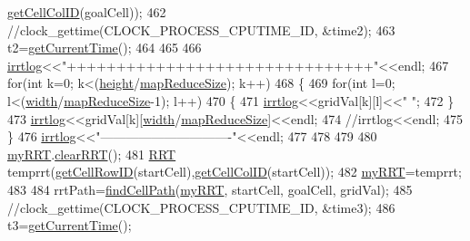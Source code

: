 \begin{DoxyCode}
{{{      \hyperlink{classrrt__plan_1_1rrt__planner_a758810b2f257fe0778ed3eb1e970d99c}{getCellColID}(goalCell));
462             \textcolor{comment}{//clock\_gettime(CLOCK\_PROCESS\_CPUTIME\_ID, &time2);}
463              t2=\hyperlink{rrt__planner_8cpp_a3b34910310800875174c4846e64a61bd}{getCurrentTime}();
464             
465             
466             \hyperlink{rrt__planner_8cpp_ae63d6003ff9416f7c0be6892e5bb899c}{irrtlog}<<\textcolor{stringliteral}{"+++++++++++++++++++++++++++++++"}<<endl;
467             \textcolor{keywordflow}{for}(\textcolor{keywordtype}{int} k=0; k<(\hyperlink{classrrt__plan_1_1rrt__planner_a3549de56a50bff6494514878b64584df}{height}/\hyperlink{rrt_8h_afb8b6147953aaf9e7089f5f157d5b020}{mapReduceSize}); k++)
468             \{
469                 \textcolor{keywordflow}{for}(\textcolor{keywordtype}{int} l=0; l<(\hyperlink{classrrt__plan_1_1rrt__planner_ac74fe436b5e1fa30bda1fbe821369aa2}{width}/\hyperlink{rrt_8h_afb8b6147953aaf9e7089f5f157d5b020}{mapReduceSize}-1); l++)
470                 \{
471                     \hyperlink{rrt__planner_8cpp_ae63d6003ff9416f7c0be6892e5bb899c}{irrtlog}<<gridVal[k][l]<<\textcolor{stringliteral}{" "};
472                 \}
473                 \hyperlink{rrt__planner_8cpp_ae63d6003ff9416f7c0be6892e5bb899c}{irrtlog}<<gridVal[k][\hyperlink{classrrt__plan_1_1rrt__planner_ac74fe436b5e1fa30bda1fbe821369aa2}{width}/\hyperlink{rrt_8h_afb8b6147953aaf9e7089f5f157d5b020}{mapReduceSize}]<<endl;
474                 \textcolor{comment}{//irrtlog<<endl;}
475             \}
476             \hyperlink{rrt__planner_8cpp_ae63d6003ff9416f7c0be6892e5bb899c}{irrtlog}<<\textcolor{stringliteral}{"-------------------------------"}<<endl;
477             
478             
479 
480             \hyperlink{rrt__planner_8cpp_a51725e16375c08b52f82eb2faa5a921c}{myRRT}.\hyperlink{classRRT_affd1f4f4e35541cdca748bac5c1bbd34}{clearRRT}();
481             \hyperlink{classRRT}{RRT} temprrt(\hyperlink{classrrt__plan_1_1rrt__planner_aa3c07d6b2b6bed62e4b60d3898fc80cf}{getCellRowID}(startCell),\hyperlink{classrrt__plan_1_1rrt__planner_a758810b2f257fe0778ed3eb1e970d99c}{getCellColID}(startCell));
482             \hyperlink{rrt__planner_8cpp_a51725e16375c08b52f82eb2faa5a921c}{myRRT}=temprrt;
483 
484             rrtPath=\hyperlink{classrrt__plan_1_1rrt__planner_a23e32ef1c189f5035a751047f84e052a}{findCellPath}(\hyperlink{rrt__planner_8cpp_a51725e16375c08b52f82eb2faa5a921c}{myRRT}, startCell, goalCell, gridVal);
485             \textcolor{comment}{//clock\_gettime(CLOCK\_PROCESS\_CPUTIME\_ID, &time3);}
486             t3=\hyperlink{rrt__planner_8cpp_a3b34910310800875174c4846e64a61bd}{getCurrentTime}();
}}}
\end{DoxyCode}
